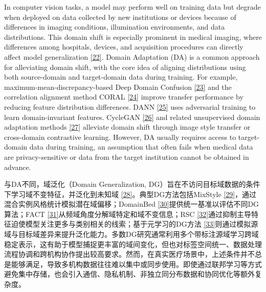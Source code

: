 In computer vision tasks, a model may perform well on training data but degrade when deployed on data collected by new institutions or devices because of differences in imaging conditions, illumination environments, and data distributions. This domain shift is especially prominent in medical imaging, where differences among hospitals, devices, and acquisition procedures can directly affect model generalization \hyperref[_Ref213949439]{{[}22{]}}. Domain Adaptation (DA) is a common approach for alleviating domain shift, with the core idea of aligning distributions using both source-domain and target-domain data during training. For example, maximum-mean-discrepancy-based Deep Domain Confusion \hyperref[_Ref213949448]{{[}23{]}} and the correlation alignment method CORAL \hyperref[_Ref213949453]{{[}24{]}} improve transfer performance by reducing feature distribution differences. DANN \hyperref[_Ref213949479]{{[}25{]}} uses adversarial training to learn domain-invariant features. CycleGAN \hyperref[_Ref213949490]{{[}26{]}} and related unsupervised domain adaptation methods \hyperref[_Ref213949530]{{[}27{]}} alleviate domain shift through image style transfer or cross-domain contrastive learning. However, DA usually requires access to target-domain data during training, an assumption that often fails when medical data are privacy-sensitive or data from the target institution cannot be obtained in advance.

与DA不同，域泛化（Domain Generalization, DG）旨在不访问目标域数据的条件下学习域不变特征，并泛化到未知域 \hyperref[_Ref213949554]{{[}28{]}}。典型DG方法包括MixStyle \hyperref[_Ref213949562]{{[}29{]}}，通过混合实例风格统计模拟潜在域偏移；DomainBed \hyperref[_Ref213949607]{{[}30{]}}提供统一基准以评估不同DG算法；FACT \hyperref[_Ref213949788]{{[}31{]}}从频域角度分解域特定和域不变信息；RSC \hyperref[_Ref213949796]{{[}32{]}}通过抑制主导特征迫使模型关注更多与类别相关的线索；基于元学习的DG方法 \hyperref[_Ref213949803]{{[}33{]}}则通过模拟源域与目标域差异来提升泛化能力。多数DG研究通常利用多个带标注源域学习跨域稳定表示，这有助于模型捕捉更丰富的域间变化，但也对标签空间统一、数据处理流程协调和跨机构协作提出较高要求。然而，在真实医疗场景中，上述条件并不总是能够满足，导致多机构数据往往难以集中或同步使用。即使通过联邦学习等方式避免集中存储，也会引入通信、隐私机制、非独立同分布数据和协同优化等额外复杂度。

